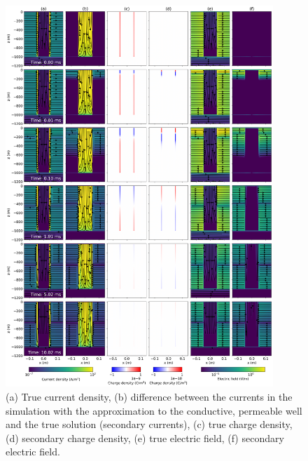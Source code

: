 \begin{figure}
    \begin{center}
    \includegraphics[width=0.9\textwidth]{figures/em_casing/electric-permeable.png}
    \end{center}
\caption{
    (a) True current density, (b) difference between the currents in the simulation with the approximation to the conductive, permeable well and the true solution (secondary currents), (c) true charge density, (d) secondary charge density, (e) true electric field, (f) secondary electric field.
}
\label{fig:electric-permeable}
\end{figure}



